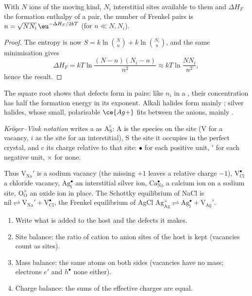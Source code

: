 \begin{proposition}\label{prop:b3:solid-state:frenkel}
With $N$ ions of the moving kind, $N_i$ interstitial sites available to them and
$\Delta H_F$ the formation enthalpy of a pair, the number of Frenkel pairs is $n =
\sqrt{NN_i}\,\eu^{-\Delta H_F/2kT}$ (for $n \ll N, N_i$).
\end{proposition}

\begin{proof}
The entropy is now $S = k\ln\binom{N}{n} + k\ln\binom{N_i}{n}$, and the same minimisation gives
\[
  \Delta H_F = kT\ln\frac{(N - n)(N_i - n)}{n^2} \approx kT\ln\frac{NN_i}{n^2},
\]
hence the result.
\end{proof}

The square root shows that defects form in pairs: like $n_i$ in a ,
their concentration has half the formation energy in its exponent. Alkali
halides form mainly ; silver halides, whose small, polarisable
$\ce{Ag+}$ fits between the anions, mainly .

\begin{definition}\label{def:b3:solid-state:kroger-vink}
\emph{Kröger--Vink notation} writes a  as $\mathrm{A_S^c}$: A is the species on the site (V for a vacancy, $i$ as the site
for an interstitial), S the site it occupies in the perfect crystal, and c its
charge relative to that site: $\bullet$ for each positive unit, $'$ for each negative
unit, $\times$ for none.
\end{definition}

Thus $\mathrm{V_{Na}'}$ is a sodium vacancy (the missing $+1$ leaves a relative charge $-1$),
$\mathrm{V_{Cl}^{\bullet}}$ a chloride vacancy, $\mathrm{Ag_i^{\bullet}}$ an interstitial silver ion, $\mathrm{Ca_{Na}^{\bullet}}$ a calcium ion on a
sodium site, $\mathrm{O_O^{\times}}$ an oxide ion in place. The Schottky equilibrium of NaCl is
$\text{nil} \rightleftharpoons \mathrm{V_{Na}' + V_{Cl}^{\bullet}}$, the Frenkel equilibrium of AgCl
$\mathrm{Ag_{Ag}^{\times}} \rightleftharpoons \mathrm{Ag_i^{\bullet} + V_{Ag}'}$.

\begin{method}\label{met:b3:solid-state:kroger-vink}
\begin{enumerate}
  \item Write what is added to the host and the defects it makes.
  \item Site balance: the ratio of cation to anion sites of the host is kept
        (vacancies count as sites).
  \item Mass balance: the same atoms on both sides (vacancies have no mass;
        electrons $e'$ and  $h^\bullet$ none either).
  \item Charge balance: the sums of the effective charges are equal.
\end{enumerate}
\end{method}

